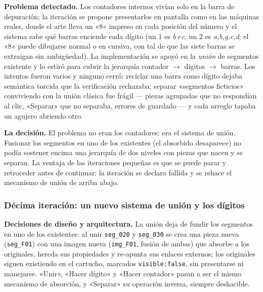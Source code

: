 \textbf{Problema detectado.} Los contadores internos vivían solo en la
barra de depuración; la iteración se propone presentarlos en pantalla
como en las máquinas reales, donde el arte lleva un «8» impreso en cada
posición del número y el sistema sabe qué barras enciende cada dígito
(un 1 es \emph{b+c}, un 2 es \emph{a,b,g,e,d}; el «8» puede dibujarse
normal o en cursiva, con tal de que las siete barras se extraigan sin
ambigüedad). La implementación se apoyó en la \emph{unión} de segmentos
existente y lo estiró para cubrir la jerarquía contador
$\rightarrow$ dígitos $\rightarrow$ barras. Los intentos fueron varios
y ninguno cerró: reciclar una barra como dígito dejaba semántica
torcida que la verificación rechazaba; separar «segmentos ficticios»
conviviendo con la unión clásica fue frágil — piezas agrupadas que no
respondían al clic, «Separar» que no separaba, errores de guardado — y
cada arreglo tapaba un agujero abriendo otro.

\textbf{La decisión.} El problema no eran los contadores: era el
sistema de unión. Fusionar los segmentos en uno de los existentes (el
absorbido desaparece) no podía sostener encima una jerarquía de dos
niveles con piezas que nacen y se separan. La ventaja de las
iteraciones pequeñas es que se puede parar y retroceder antes de
continuar: la iteración se declara fallida y se rehace el mecanismo de
unión de arriba abajo.

\subsubsection{Décima iteración: un nuevo sistema de unión y los dígitos}

\textbf{Decisiones de diseño y arquitectura.} La unión deja de fundir
los segmentos en uno de los existentes: al unir \texttt{seg\_020} y
\texttt{seg\_030} se crea una pieza nueva (\texttt{seg\_F01}) con una
imagen nueva (\texttt{img\_F01}, fusión de ambas) que absorbe a los
originales, hereda sus propiedades y re-apunta sus enlaces externos;
los originales siguen existiendo en el cartucho, marcados
\texttt{visible:false}, sin presentarse ni manejarse. «Unir», «Hacer
dígito» y «Hacer contador» pasan a ser el mismo mecanismo de
absorción, y «Separar» su operación inversa, siempre deshacible.

